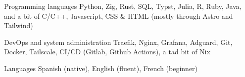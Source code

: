 

\begin{cvskills}

  \cvskill
    {Programming languages}
    {Python, Zig, Rust, SQL, Typst, Julia, R, Ruby, Java, and a bit of C/C++, Javascript, CSS \& HTML (mostly through Astro and Tailwind)} %

  \cvskill
    {DevOps and system administration} %
    {Traefik, Nginx, Grafana, Adguard, Git, Docker, Tailscale, CI/CD (Gitlab, Github Actions), a tad bit of Nix} %

  \cvskill
    {Languages} %
    {Spanish (native), English (fluent), French (beginner)} %

\end{cvskills}
